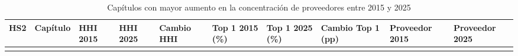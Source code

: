 \documentclass[
]{article}
\begin{document}
\begin{longtable}[]{@{}
  >{\raggedright\arraybackslash}p{}
  >{\raggedright\arraybackslash}p{}
  >{\raggedleft\arraybackslash}p{}
  >{\raggedleft\arraybackslash}p{}
  >{\raggedleft\arraybackslash}p{}
  >{\raggedleft\arraybackslash}p{}
  >{\raggedleft\arraybackslash}p{}
  >{\raggedleft\arraybackslash}p{}
  >{\raggedright\arraybackslash}p{}
  >{\raggedright\arraybackslash}p{}@{}}
\caption{Capítulos con mayor aumento en la concentración de proveedores
entre 2015 y 2025}\tabularnewline
\toprule\noalign{}
\begin{minipage}[b]{\linewidth}\raggedright
HS2
\end{minipage} & \begin{minipage}[b]{\linewidth}\raggedright
Capítulo
\end{minipage} & \begin{minipage}[b]{\linewidth}\raggedleft
HHI 2015
\end{minipage} & \begin{minipage}[b]{\linewidth}\raggedleft
HHI 2025
\end{minipage} & \begin{minipage}[b]{\linewidth}\raggedleft
Cambio HHI
\end{minipage} & \begin{minipage}[b]{\linewidth}\raggedleft
Top 1 2015 (\%)
\end{minipage} & \begin{minipage}[b]{\linewidth}\raggedleft
Top 1 2025 (\%)
\end{minipage} & \begin{minipage}[b]{\linewidth}\raggedleft
Cambio Top 1 (pp)
\end{minipage} & \begin{minipage}[b]{\linewidth}\raggedright
Proveedor 2015
\end{minipage} & \begin{minipage}[b]{\linewidth}\raggedright
Proveedor 2025
\end{minipage} \\
\midrule\noalign{}
\endfirsthead
\toprule\noalign{}
\begin{minipage}[b]{\linewidth}\raggedright

\end{minipage}
\end{longtable}
\end{document}
